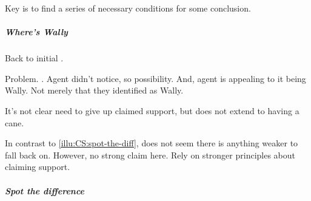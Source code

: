 \begin{note}
  Key is to find a series of necessary conditions for some conclusion.
\end{note}

\subparagraph{Where's Wally}

\begin{note}
  Back to initial .
\end{note}

\begin{note}
  Problem.
  \requ{}.
  Agent didn't notice, so possibility.
  And, agent is appealing to it being Wally.
  Not merely that they identified as Wally.

  It's not clear need to give up claimed support, but does not extend to having a cane.

  In contrast to \ref{illu:CS:spot-the-diff}, does not seem there is anything weaker to fall back on.
  However, no strong claim here.
  Rely on stronger principles about claiming support.
\end{note}

\subparagraph{Spot the difference}


